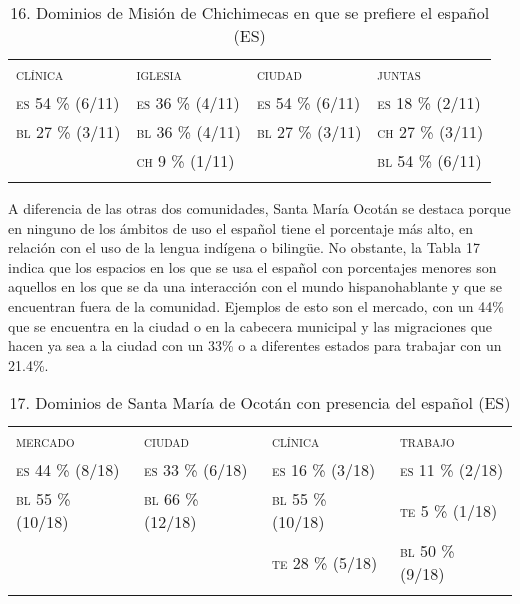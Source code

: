 \documentclass[output=paper]{../langscibook}
\begin{document}
\begin{table}
\caption{\label{tab:guerrero}16. Dominios de Misión de Chichimecas en que se prefiere el español (ES)}
\begin{tabularx}{\textwidth}{XXXX}
\lsptoprule
{\textsc{clínica}} & {\textsc{iglesia}} & {\textsc{ciudad}} & {\textsc{juntas}}\\
{\textsc{es} \textsc{54} \textsc{\%} \textsc{(6/11)}} & {\textsc{es} \textsc{36} \textsc{\%} \textsc{(4/11)}} & {\textsc{es} \textsc{54} \textsc{\%} \textsc{(6/11)}} & {\textsc{es} \textsc{18} \textsc{\%} \textsc{(2/11)}}\\
{\textsc{bl} \textsc{27} \textsc{\%} \textsc{(3/11)}} & {\textsc{bl} \textsc{36} \textsc{\%} \textsc{(4/11)}} & {\textsc{bl} \textsc{27} \textsc{\%} \textsc{(3/11)}} & {\textsc{ch} \textsc{27} \textsc{\%} \textsc{(3/11)}}\\
& {\textsc{ch} \textsc{9} \textsc{\%} \textsc{(1/11)}} &  & {\textsc{bl} \textsc{54} \textsc{\%} \textsc{(6/11)}}\\
\lspbottomrule
\end{tabularx}
\end{table}

A diferencia de las otras dos comunidades, Santa María Ocotán se destaca porque en ninguno de los ámbitos de uso el español tiene el porcentaje más alto, en relación con el uso de la lengua indígena o bilingüe. No obstante, la Tabla 17 indica que los espacios en los que se usa el español con porcentajes menores son aquellos en los que se da una interacción con el mundo hispanohablante y que se encuentran fuera de la comunidad. Ejemplos de esto son el mercado, con un 44\% que se encuentra en la ciudad o en la cabecera municipal y las migraciones que hacen ya sea a la ciudad con un 33\% o a diferentes estados para trabajar con un 21.4\%.

\begin{table}
\caption{\label{tab:guerrero}17. Dominios de Santa María de Ocotán con presencia del español (ES)}
\begin{tabularx}{\textwidth}{XXXX}
\lsptoprule
{\textsc{mercado}} & {\textsc{ciudad}} & {\textsc{clínica}} & {\textsc{trabajo}}\\
{\textsc{es} \textsc{44} \textsc{\%} \textsc{(8/18)}} & {\textsc{es} \textsc{33} \textsc{\%} \textsc{(6/18)}} & {\textsc{es} 16 \% (3/18)} & {\textsc{es} \textsc{11} \textsc{\%} \textsc{(2/18)}}\\
{\textsc{bl} \textsc{55} \textsc{\%} \textsc{(10/18)}} & {\textsc{bl} \textsc{66} \textsc{\%} \textsc{(12/18)}} & {\textsc{bl} \textsc{55} \textsc{\%} \textsc{(10/18)}} & {\textsc{te} \textsc{5} \textsc{\%} \textsc{(1/18)}}\\
&  & {\textsc{te} \textsc{28} \textsc{\%} \textsc{(5/18)}} & {\textsc{bl} \textsc{50} \textsc{\%} \textsc{(9/18)}}\\
\lspbottomrule
\end{tabularx}
\end{table}
\end{document}
